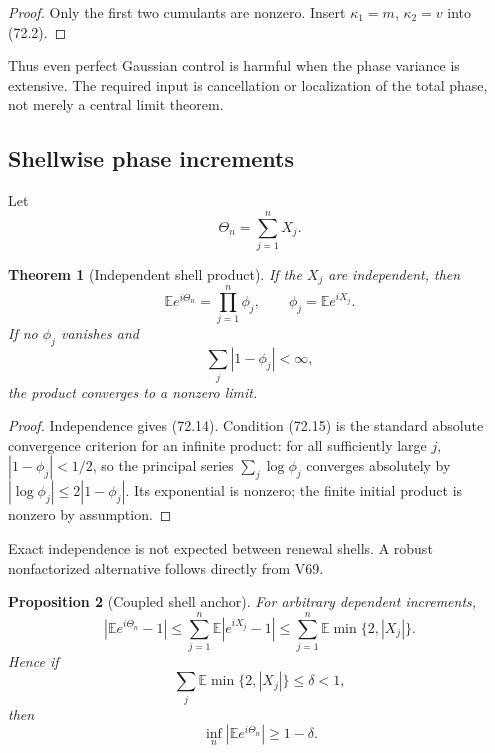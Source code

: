 \documentclass[11pt]{article}
\newtheorem{theorem}{Theorem}[section]
\newtheorem{proposition}[theorem]{Proposition}
\begin{document}
\begin{proof}
Only the first two cumulants are nonzero.  Insert
\(\kappa_1=m\), \(\kappa_2=v\) into (72.2).
\end{proof}

Thus even perfect Gaussian control is harmful when the phase variance
is extensive.  The required input is cancellation or localization of
the total phase, not merely a central limit theorem.

\subsection{Shellwise phase increments}

Let
\[
                              \Theta_n=\sum_{j=1}^nX_j.        \tag{72.13}
\]

\begin{theorem}[Independent shell product]
\label{thm:v11v72-product}
If the \(X_j\) are independent, then
\[
                         {\mathbb E}e^{i\Theta_n}
                           =\prod_{j=1}^n\phi_j,\qquad
                         \phi_j={\mathbb E}e^{iX_j}.           \tag{72.14}
\]
If no \(\phi_j\) vanishes and
\[
                              \sum_j|1-\phi_j|<\infty,         \tag{72.15}
\]
the product converges to a nonzero limit.
\end{theorem}

\begin{proof}
Independence gives (72.14).  Condition (72.15) is the standard
absolute convergence criterion for an infinite product:
for all sufficiently large \(j\), \(|1-\phi_j|<1/2\), so the principal
series \(\sum_j\log\phi_j\) converges absolutely by
\(|\log\phi_j|\le2|1-\phi_j|\).  Its exponential is nonzero; the finite
initial product is nonzero by assumption.
\end{proof}

Exact independence is not expected between renewal shells.  A robust
nonfactorized alternative follows directly from V69.

\begin{proposition}[Coupled shell anchor]
\label{prop:v11v72-shell-anchor}
For arbitrary dependent increments,
\[
 \left|{\mathbb E}e^{i\Theta_n}-1\right|
 \le\sum_{j=1}^n{\mathbb E}
             |e^{iX_j}-1|
 \le\sum_{j=1}^n{\mathbb E}\min\{2,|X_j|\}.                  \tag{72.16}
\]
Hence if
\[
                              \sum_j{\mathbb E}
                              \min\{2,|X_j|\}\le\delta<1,      \tag{72.17}
\]
then
\[
                              \inf_n|{\mathbb E}e^{i\Theta_n}|
                                  \ge1-\delta.                 \tag{72.18}
\]
\end{proposition}
\end{document}
